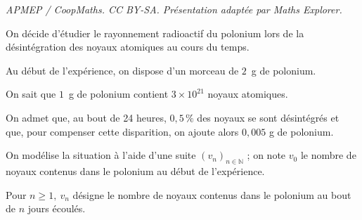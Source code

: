 \documentclass[10pt]{article}
\providecommand{\N}{\mathbb{N}}
\begin{document}
\noindent\textit{APMEP / CoopMaths. CC BY-SA. Présentation adaptée par Maths Explorer.}\par\medskip
\medskip

On décide d'étudier le rayonnement radioactif du polonium lors de la désintégration des noyaux atomiques au cours du temps.

Au début de l'expérience, on dispose d'un morceau de $2$~g de polonium.

On sait que $1$~g de polonium contient $3 \times 10^{21}$ noyaux atomiques.

On admet que, au bout de 24 heures, $0,5\,\%$ des noyaux se sont désintégrés et que, pour compenser cette disparition, on ajoute alors $0,005$ g de polonium.

On modélise la situation à l'aide d'une suite $\left(v_n\right)_{n \in \N}$ ; on note $v_0$ le nombre de noyaux contenus dans le polonium au début de l'expérience. 

Pour $n \geqslant 1,\: v_n$ désigne le nombre de noyaux contenus dans le polonium au bout de $n$ jours écoulés.

\medskip
\end{document}
